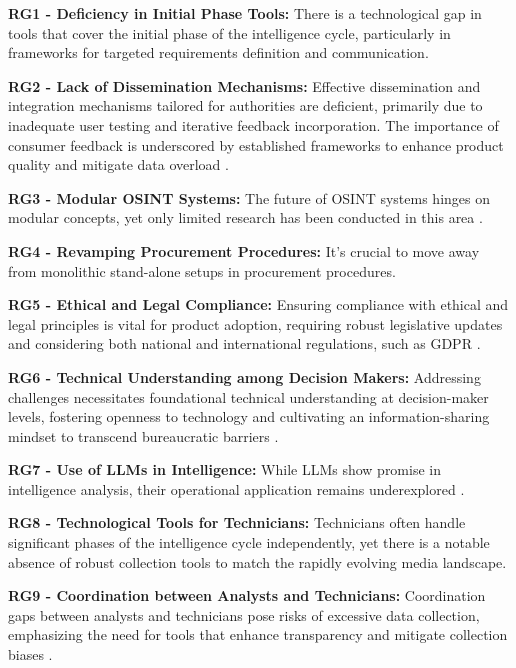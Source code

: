 \documentclass[10pt]{article}
\begin{document}
\textbf{RG1 - Deficiency in Initial Phase Tools:} There is a technological gap in tools that cover the initial phase of the intelligence cycle, particularly in frameworks for targeted requirements definition and communication.

\textbf{RG2 - Lack of Dissemination Mechanisms:} Effective dissemination and integration mechanisms tailored for authorities are deficient, primarily due to inadequate user testing and iterative feedback incorporation. The importance of consumer feedback is underscored by established frameworks to enhance product quality and mitigate data overload \cite{JointChiefsofStaffU.S.Army.2013, NorthAtlanticTreatyOrganization.2001}.

\textbf{RG3 - Modular OSINT Systems:} The future of OSINT systems hinges on modular concepts, yet only limited research has been conducted in this area \cite{Arjun.2020,Wright.2020}.

\textbf{RG4 - Revamping Procurement Procedures:} It's crucial to move away from monolithic stand-alone setups in procurement procedures.

\textbf{RG5 - Ethical and Legal Compliance:} Ensuring compliance with ethical and legal principles is vital for product adoption, requiring robust legislative updates and considering both national and international regulations, such as GDPR \cite{EuropeanParliament.2016,EuropeanCommission.18.08.2023,Wittmer.2022}.

\textbf{RG6 - Technical Understanding among Decision Makers:} Addressing challenges necessitates foundational technical understanding at decision-maker levels, fostering openness to technology and cultivating an information-sharing mindset to transcend bureaucratic barriers \cite{NorthAtlanticTreatyOrganization.2001}.

\textbf{RG7 - Use of LLMs in Intelligence:} While LLMs show promise in intelligence analysis, their operational application remains underexplored \cite{Radford.2023,Zhao.31.03.2023}.

\textbf{RG8 - Technological Tools for Technicians:} Technicians often handle significant phases of the intelligence cycle independently, yet there is a notable absence of robust collection tools to match the rapidly evolving media landscape.

\textbf{RG9 - Coordination between Analysts and Technicians:} Coordination gaps between analysts and technicians pose risks of excessive data collection, emphasizing the need for tools that enhance transparency and mitigate collection biases \cite{Lowenthal.2020}.
\end{document}
